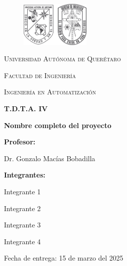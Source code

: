 \documentclass{report}          %
\newcommand{\fullname}      {Nombre completo del proyecto}
\newcommand{\docdate}       {15 de marzo del 2025}
\begin{document}
    \begin{titlepage}
        \centering
        \begin{figure}[ht]
            \centering
            \includegraphics[width=0.3\textwidth]{Recursos/Imagenes/Portada/logos_fi_uaq.png}
        \end{figure}
        
        \vspace{1cm}
        {\scshape\LARGE Universidad Autónoma de Querétaro \par}
        \vspace{0.5cm}
        {\scshape\Large Facultad de Ingeniería \par}
        \vspace{0.5cm}
        {\scshape\Large Ingeniería en Automatización \par}
        
        \vspace{1.5cm}
        {\Large\bfseries T.D.T.A. IV \par}
        
        \vspace{1cm}
        {\Large\bfseries \fullname \par}
        
        \vspace{1.5cm}
        {\large \textbf{Profesor:} \par}
        {\large Dr. Gonzalo Macías Bobadilla \par}
        
        \vspace{1.5cm}
        {\large \textbf{Integrantes:} \par}
        \begin{center}
            \large
            Integrante 1\par
            \vspace{0.4cm}
            Integrante 2\par
            \vspace{0.4cm}
            Integrante 3\par
            \vspace{0.4cm}
            Integrante 4\par
        \end{center}
        
        \vfill      %

        {\large Fecha de entrega: \docdate \par}
    \end{titlepage}
\end{document}
